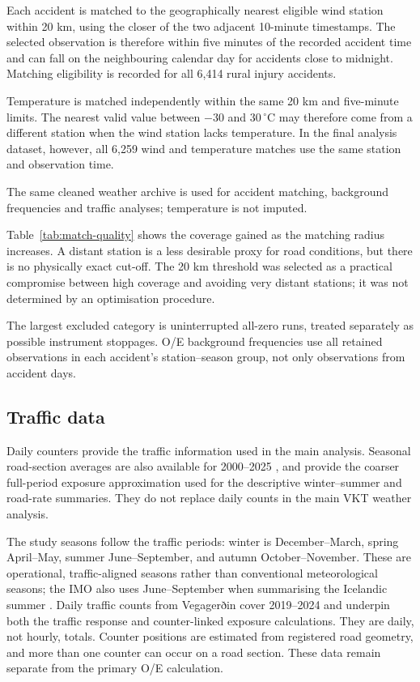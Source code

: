 Each accident is matched to the geographically nearest eligible wind station
within 20 km, using the closer of the two adjacent 10-minute timestamps. The
selected observation is therefore within five minutes of the recorded accident
time and can fall on the neighbouring calendar day for accidents close to
midnight. Matching eligibility is recorded for all 6,414 rural injury accidents.

Temperature is matched independently within the same 20 km and five-minute
limits. The nearest valid value between $-30$ and
$30\,^{\circ}\mathrm{C}$ may therefore come from a different station when the
wind station lacks temperature. In the final analysis dataset, however, all
6,259 wind and temperature matches use the same station and observation time.

The same cleaned weather archive is used for accident matching, background
frequencies and traffic analyses; temperature is not
imputed.

Table~\ref{tab:match-quality} shows the coverage gained as the matching radius
increases. A distant station is a less desirable proxy for road conditions,
but there is no physically exact cut-off. The 20 km threshold was selected as
a practical compromise between high coverage and avoiding very distant stations;
it was not determined by an optimisation procedure.





The largest excluded category is uninterrupted all-zero runs, treated
separately as possible instrument stoppages. O/E background frequencies use all
retained observations in each accident's station--season group, not only
observations from accident days.



\subsection{Traffic data}

Daily counters provide the traffic information used in the main analysis.
Seasonal road-section averages are also available for 2000--2025
\citep{vegagerdinTraffic}, and provide the coarser full-period exposure approximation used for the descriptive winter--summer and road-rate summaries. They do not replace daily counts in the main VKT weather analysis.

The study seasons follow the traffic periods: winter is December--March,
spring April--May, summer June--September, and autumn October--November. These
are operational, traffic-aligned seasons rather than conventional
meteorological seasons; the IMO also uses June--September when summarising the
Icelandic summer \citep{vedurSummer2025}.
Daily traffic counts from Vegagerðin cover 2019--2024 and underpin both the
traffic response and counter-linked exposure calculations. They are daily, not
hourly, totals. Counter positions are estimated from registered road geometry,
and more than one counter can occur on a road section. These data remain
separate from the primary O/E calculation.

